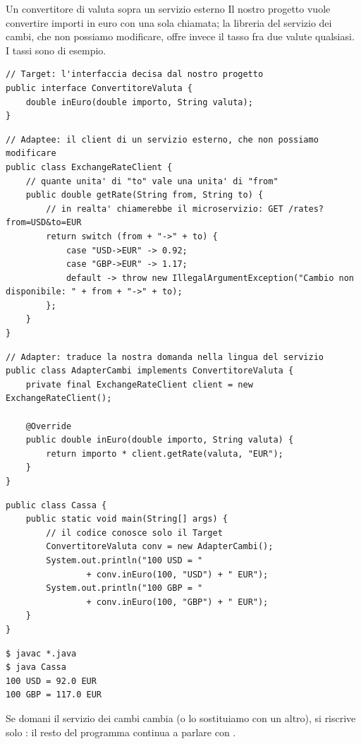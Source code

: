 \begin{esempio}{Un convertitore di valuta sopra un servizio esterno}
Il nostro progetto vuole convertire importi in euro con una sola chiamata; la libreria del servizio dei cambi, che non
possiamo modificare, offre invece il tasso fra due valute qualsiasi. I tassi sono di esempio.

\begin{lstlisting}[style=java, name=ConvertitoreValuta.java]
// Target: l'interfaccia decisa dal nostro progetto
public interface ConvertitoreValuta {
    double inEuro(double importo, String valuta);
}
\end{lstlisting}
\begin{lstlisting}[style=java, name=ExchangeRateClient.java]
// Adaptee: il client di un servizio esterno, che non possiamo modificare
public class ExchangeRateClient {
    // quante unita' di "to" vale una unita' di "from"
    public double getRate(String from, String to) {
        // in realta' chiamerebbe il microservizio: GET /rates?from=USD&to=EUR
        return switch (from + "->" + to) {
            case "USD->EUR" -> 0.92;
            case "GBP->EUR" -> 1.17;
            default -> throw new IllegalArgumentException("Cambio non disponibile: " + from + "->" + to);
        };
    }
}
\end{lstlisting}
\begin{lstlisting}[style=java, name=AdapterCambi.java]
// Adapter: traduce la nostra domanda nella lingua del servizio
public class AdapterCambi implements ConvertitoreValuta {
    private final ExchangeRateClient client = new ExchangeRateClient();

    @Override
    public double inEuro(double importo, String valuta) {
        return importo * client.getRate(valuta, "EUR");
    }
}
\end{lstlisting}
\noindent\begin{minipage}[t]{0.6\textwidth}
\begin{lstlisting}[style=java, name=Cassa.java]
public class Cassa {
    public static void main(String[] args) {
        // il codice conosce solo il Target
        ConvertitoreValuta conv = new AdapterCambi();
        System.out.println("100 USD = "
                + conv.inEuro(100, "USD") + " EUR");
        System.out.println("100 GBP = "
                + conv.inEuro(100, "GBP") + " EUR");
    }
}
\end{lstlisting}
\end{minipage}\hfill
\begin{minipage}[t]{0.37\textwidth}
\begin{lstlisting}[style=shell, name=Terminale]
$ javac *.java
$ java Cassa
100 USD = 92.0 EUR
100 GBP = 117.0 EUR
\end{lstlisting}
\end{minipage}

\medskip
Se domani il servizio dei cambi cambia (o lo sostituiamo con un altro), si riscrive solo : il resto del
programma continua a parlare con .
\end{esempio}

